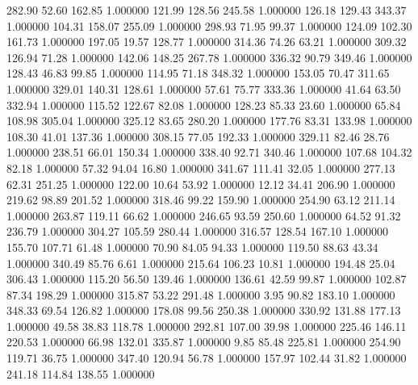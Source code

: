     282.90     52.60    162.85  1.000000
    121.99    128.56    245.58  1.000000
    126.18    129.43    343.37  1.000000
    104.31    158.07    255.09  1.000000
    298.93     71.95     99.37  1.000000
    124.09    102.30    161.73  1.000000
    197.05     19.57    128.77  1.000000
    314.36     74.26     63.21  1.000000
    309.32    126.94     71.28  1.000000
    142.06    148.25    267.78  1.000000
    336.32     90.79    349.46  1.000000
    128.43     46.83     99.85  1.000000
    114.95     71.18    348.32  1.000000
    153.05     70.47    311.65  1.000000
    329.01    140.31    128.61  1.000000
     57.61     75.77    333.36  1.000000
     41.64     63.50    332.94  1.000000
    115.52    122.67     82.08  1.000000
    128.23     85.33     23.60  1.000000
     65.84    108.98    305.04  1.000000
    325.12     83.65    280.20  1.000000
    177.76     83.31    133.98  1.000000
    108.30     41.01    137.36  1.000000
    308.15     77.05    192.33  1.000000
    329.11     82.46     28.76  1.000000
    238.51     66.01    150.34  1.000000
    338.40     92.71    340.46  1.000000
    107.68    104.32     82.18  1.000000
     57.32     94.04     16.80  1.000000
    341.67    111.41     32.05  1.000000
    277.13     62.31    251.25  1.000000
    122.00     10.64     53.92  1.000000
     12.12     34.41    206.90  1.000000
    219.62     98.89    201.52  1.000000
    318.46     99.22    159.90  1.000000
    254.90     63.12    211.14  1.000000
    263.87    119.11     66.62  1.000000
    246.65     93.59    250.60  1.000000
     64.52     91.32    236.79  1.000000
    304.27    105.59    280.44  1.000000
    316.57    128.54    167.10  1.000000
    155.70    107.71     61.48  1.000000
     70.90     84.05     94.33  1.000000
    119.50     88.63     43.34  1.000000
    340.49     85.76      6.61  1.000000
    215.64    106.23     10.81  1.000000
    194.48     25.04    306.43  1.000000
    115.20     56.50    139.46  1.000000
    136.61     42.59     99.87  1.000000
    102.87     87.34    198.29  1.000000
    315.87     53.22    291.48  1.000000
      3.95     90.82    183.10  1.000000
    348.33     69.54    126.82  1.000000
    178.08     99.56    250.38  1.000000
    330.92    131.88    177.13  1.000000
     49.58     38.83    118.78  1.000000
    292.81    107.00     39.98  1.000000
    225.46    146.11    220.53  1.000000
     66.98    132.01    335.87  1.000000
      9.85     85.48    225.81  1.000000
    254.90    119.71     36.75  1.000000
    347.40    120.94     56.78  1.000000
    157.97    102.44     31.82  1.000000
    241.18    114.84    138.55  1.000000
